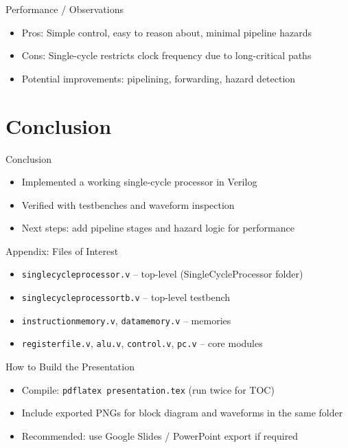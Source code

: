 \documentclass[aspectratio=169]{beamer}
\begin{document}
\begin{frame}{Performance / Observations}
  \begin{itemize}
    \item Pros: Simple control, easy to reason about, minimal pipeline hazards
    \item Cons: Single-cycle restricts clock frequency due to long-critical paths
    \item Potential improvements: pipelining, forwarding, hazard detection
  \end{itemize}
\end{frame}

\section{Conclusion}
\begin{frame}{Conclusion}
  \begin{itemize}
    \item Implemented a working single-cycle processor in Verilog
    \item Verified with testbenches and waveform inspection
    \item Next steps: add pipeline stages and hazard logic for performance
  \end{itemize}
\end{frame}

\begin{frame}{Appendix: Files of Interest}
  \begin{itemize}
    \item \texttt{single\textunderscore cycle\textunderscore processor.v} -- top-level (Single\textunderscore Cycle\textunderscore Processor folder)
    \item \texttt{single\textunderscore cycle\textunderscore processor\textunderscore tb.v} -- top-level testbench
    \item \texttt{instruction\textunderscore memory.v}, \texttt{data\textunderscore memory.v} -- memories
    \item \texttt{register\textunderscore file.v}, \texttt{alu.v}, \texttt{control.v}, \texttt{pc.v} -- core modules
  \end{itemize}
\end{frame}

\begin{frame}{How to Build the Presentation}
  \begin{itemize}
    \item Compile: \texttt{pdflatex presentation.tex} (run twice for TOC)
    \item Include exported PNGs for block diagram and waveforms in the same folder
    \item Recommended: use Google Slides / PowerPoint export if required
  \end{itemize}
\end{frame}
\end{document}
